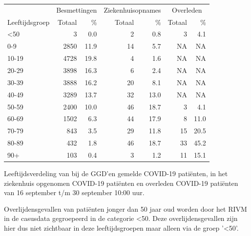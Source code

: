 \documentclass[
  english,
  man,floatsintext]{apa6}
\begin{document}
\begin{table}
\centering\begingroup\fontsize{11}{13}\selectfont

\begin{threeparttable}
\begin{tabular}{lrrrrrr}
\toprule
\multicolumn{1}{c}{ } & \multicolumn{2}{c}{Besmettingen} & \multicolumn{2}{c}{Ziekenhuisopnames} & \multicolumn{2}{c}{Overleden} \\
\cmidrule(l{3pt}r{3pt}){2-3} \cmidrule(l{3pt}r{3pt}){4-5} \cmidrule(l{3pt}r{3pt}){6-7}
Leeftijdsgroep & Totaal & \% & Totaal & \% & Totaal & \%\\
\midrule
<50 & 3 & 0.0 & 2 & 0.8 & 3 & 4.1\\
0-9 & 2850 & 11.9 & 14 & 5.7 & NA & NA\\
10-19 & 4728 & 19.8 & 4 & 1.6 & NA & NA\\
20-29 & 3898 & 16.3 & 6 & 2.4 & NA & NA\\
30-39 & 3888 & 16.2 & 20 & 8.1 & NA & NA\\
40-49 & 3289 & 13.7 & 32 & 13.0 & NA & NA\\
50-59 & 2400 & 10.0 & 46 & 18.7 & 3 & 4.1\\
60-69 & 1502 & 6.3 & 44 & 17.9 & 8 & 11.0\\
70-79 & 843 & 3.5 & 29 & 11.8 & 15 & 20.5\\
80-89 & 432 & 1.8 & 46 & 18.7 & 33 & 45.2\\
90+ & 103 & 0.4 & 3 & 1.2 & 11 & 15.1\\
\bottomrule
\end{tabular}
\begin{tablenotes}
\item[1] Leeftijdsverdeling van bij de GGD’en gemelde COVID-19 patiënten, in het ziekenhuis opgenomen COVID-19 patiënten en overleden COVID-19 patiënten van 16 september t/m 30 september 10:00 uur.
\item[2] Overlijdensgevallen van patiënten jonger dan 50 jaar oud worden door het RIVM in de casusdata gegroepeerd in de categorie <50. Deze overlijdensgevallen zijn hier dus niet zichtbaar in deze leeftijdsgroepen maar alleen via de groep '<50'.
\end{tablenotes}
\end{threeparttable}
\endgroup{}
\end{table}

\newpage
\end{document}
